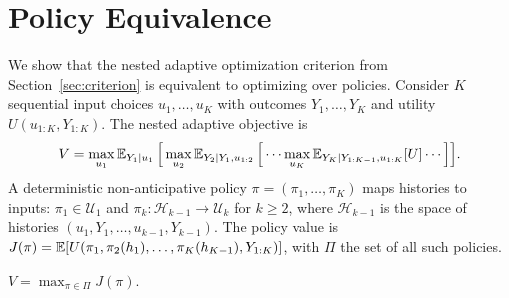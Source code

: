 \section{Policy Equivalence}
\label{sec:policy_equiv}

We show that the nested adaptive optimization criterion from Section~\ref{sec:criterion} is equivalent to optimizing over policies. Consider $K$ sequential input choices $u_1,\ldots,u_K$ with outcomes $Y_1,\ldots,Y_K$ and utility $U(u_{1:K},Y_{1:K})$. The nested adaptive objective is
\begin{equation}
V = \max_{u_1} \operatorname{\mathbb{E}}_{Y_1|u_1}\Big[\max_{u_2} \operatorname{\mathbb{E}}_{Y_2|Y_1,u_{1:2}}\Big[\cdots \max_{u_K} \operatorname{\mathbb{E}}_{Y_K|Y_{1:K-1},u_{1:K}}[U]\cdots\Big]\Big].
\end{equation}
A deterministic non-anticipative policy $\pi = (\pi_1,\ldots,\pi_K)$ maps histories to inputs: $\pi_1 \in \mathcal{U}_1$ and $\pi_k: \mathcal{H}_{k-1} \to \mathcal{U}_k$ for $k \geq 2$, where $\mathcal{H}_{k-1}$ is the space of histories $(u_1,Y_1,\ldots,u_{k-1},Y_{k-1})$. The policy value is $J(\pi) = \operatorname{\mathbb{E}}[U(\pi_1, \pi_2(h_1), \ldots, \pi_K(h_{K-1}), Y_{1:K})]$, with $\Pi$ the set of all such policies.

\begin{theorem}
\label{thm:policy_equiv}
$V = \max_{\pi \in \Pi} J(\pi)$.
\end{theorem}

